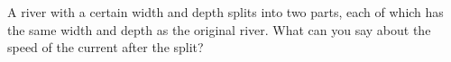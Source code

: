 A river with a certain width and depth splits into two parts, each of which
        has the same width and depth as the original river. What can you say about the
        speed of the current after the split?
